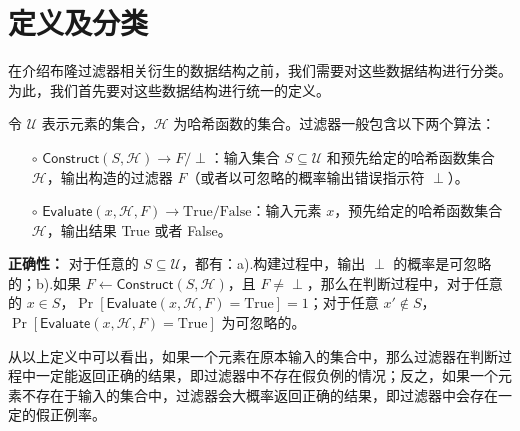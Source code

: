 
\section{定义及分类}\label{sec:defi_cate}

在介绍布隆过滤器相关衍生的数据结构之前，我们需要对这些数据结构进行分类。
为此，我们首先要对这些数据结构进行统一的定义。

\begin{definition}[过滤器]\label{def:filter}
    令 $\mathcal{U}$ 表示元素的集合，$\mathcal{H}$ 为哈希函数的集合。过滤器一般包含以下两个算法：
    \begin{itemize}
    \item[$\circ$] $\mathsf{Construct}(S, \mathcal{H}) \to F/\perp$：输入集合 $S \subseteq \mathcal{U}$ 和预先给定的哈希函数集合 $\mathcal{H}$，输出构造的过滤器 $F$（或者以可忽略的概率输出错误指示符 $\perp$）。
    \item[$\circ$] $\mathsf{Evaluate}(x, \mathcal{H}, F) \to \mbox{True}/\mbox{False} $：输入元素 $x$，预先给定的哈希函数集合 $\mathcal{H}$，输出结果 True 或者 False。
    \end{itemize}

    \textbf{正确性：} 对于任意的 $S \subseteq \mathcal{U}$，都有：a).构建过程中，输出 $\perp$ 的概率是可忽略的；b).如果 $F \gets \mathsf{Construct}(S, \mathcal{H})$，且 $F \neq \perp$，那么在判断过程中，对于任意的 $x \in S$，$\Pr[\mathsf{Evaluate}(x, \mathcal{H}, F) = \mbox{True}] = 1$；对于任意 $x' \notin S$，$\Pr[\mathsf{Evaluate}(x, \mathcal{H}, F) = \mbox{True}]$ 为可忽略的。
\end{definition}
从以上定义中可以看出，如果一个元素在原本输入的集合中，那么过滤器在判断过程中一定能返回正确的结果，即过滤器中不存在假负例的情况；反之，如果一个元素不存在于输入的集合中，过滤器会大概率返回正确的结果，即过滤器中会存在一定的假正例率。

